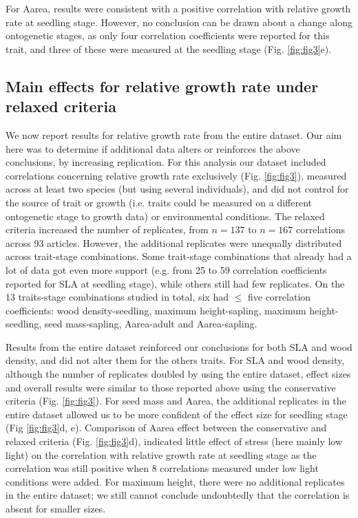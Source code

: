 \documentclass[a4paper,11pt]{article}
\begin{document}
For Aarea, results were consistent with a positive correlation with relative growth rate at seedling stage. However, no conclusion can be drawn about a change along ontogenetic stages, as only four correlation coefficients were reported for this trait, and three of these were measured at the seedling stage (Fig. \ref{fig:fig3}e).

\subsection*{Main effects for relative growth rate under relaxed criteria}

We now report results for relative growth rate from the entire dataset. Our aim here was to determine if additional data alters or reinforces the above conclusions, by increasing replication. For this analysis our dataset included correlations concerning relative growth rate exclusively (Fig. \ref{fig:fig3}), measured across at least two species (but using several individuals), and did not control for the source of trait or growth (i.e. traits could be measured on a different ontogenetic stage to growth data) or environmental conditions. The relaxed criteria increased the number of replicates, from $n = 137$ to $n = 167$ correlations across 93 articles. However, the additional replicates were unequally distributed across trait-stage combinations. Some trait-stage combinations that already had a lot of data got even more support (e.g. from 25 to 59 correlation coefficients reported for SLA at seedling stage), while others still had few replicates. On the 13 traits-stage combinations studied in total, six had $\le$ five correlation coefficients: wood density-seedling, maximum height-sapling, maximum height-seedling, seed mass-sapling, Aarea-adult and Aarea-sapling.

Results from the entire dataset reinforced our conclusions for both SLA and wood density, and did not alter them for the others traits. For SLA and wood density, although the number of replicates doubled by using the entire dataset, effect sizes and overall results were similar to those reported above using the conservative criteria (Fig. \ref{fig:fig3}). For seed mass and Aarea, the additional replicates in the entire dataset allowed us to be more confident of the effect size for seedling stage (Fig \ref{fig:fig3}d, e). Comparison of Aarea effect between the conservative and relaxed criteria (Fig. \ref{fig:fig3}d), indicated little effect of stress (here mainly low light) on the correlation with relative growth rate at seedling stage as the correlation was still positive when 8 correlations measured under low light conditions were added. For maximum height, there were no additional replicates in the entire dataset; we still cannot conclude undoubtedly that the correlation is absent for smaller sizes.
\end{document}
